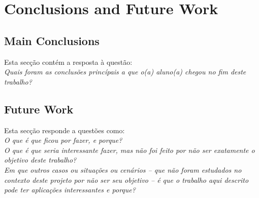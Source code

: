 \documentclass[titlepage,12pt,a4paper,times]{book}
\begin{document}
\chapter{Conclusions and Future Work}
\label{chap:cfw}

\section{Main Conclusions}
\label{sec:main-conc}

Esta secção contém a resposta à questão: \\
\emph{Quais foram as conclusões princípais a que o(a) aluno(a) chegou no fim
deste trabalho?}

\section{Future Work}
\label{sec:future-work}

Esta secção responde a questões como:\\
\emph{O que é que ficou por fazer, e porque?}\\
\emph{O que é que seria interessante fazer, mas não foi feito por não ser
exatamente o objetivo deste trabalho?}\\
\emph{Em que outros casos ou situações ou cenários -- que não foram estudados
no contexto deste projeto por não ser seu objetivo -- é que o trabalho aqui
descrito pode ter aplicações interessantes e porque?}

% 
% 
% 
% 

\backmatter



\end{document}
